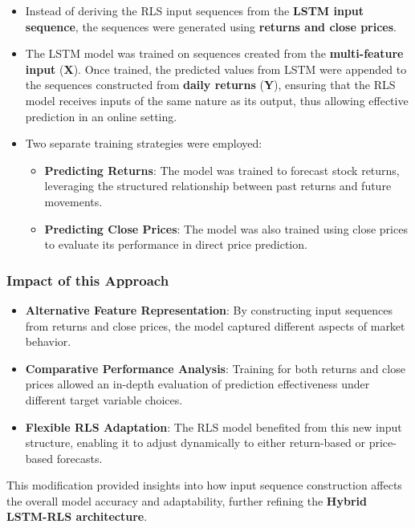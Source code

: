 \begin{itemize}
    \item Instead of deriving the RLS input sequences from the \textbf{LSTM input sequence}, the sequences were generated using \textbf{returns and close prices}.  
    \item The LSTM model was trained on sequences created from the \textbf{multi-feature input} (\textbf{X}). Once trained, the predicted values from LSTM were appended to the sequences constructed from \textbf{daily returns} (\textbf{Y}), ensuring that the RLS model receives inputs of the same nature as its output, thus allowing effective prediction in an online setting.
    \item Two separate training strategies were employed:  
    \begin{itemize}
        \item \textbf{Predicting Returns}: The model was trained to forecast stock returns, leveraging the structured relationship between past returns and future movements.  
        \item \textbf{Predicting Close Prices}: The model was also trained using close prices to evaluate its performance in direct price prediction.
    \end{itemize}
\end{itemize}

\subsubsection{Impact of this Approach}

\begin{itemize}
    \item \textbf{Alternative Feature Representation}: By constructing input sequences \\from returns and close prices, the model captured different aspects of market behavior.  
    \item \textbf{Comparative Performance Analysis}: Training for both returns and close prices allowed an in-depth evaluation of prediction effectiveness under different target variable choices.  
    \item \textbf{Flexible RLS Adaptation}: The RLS model benefited from this new input structure, enabling it to adjust dynamically to either return-based or price-based forecasts.  
\end{itemize}

This modification provided insights into how input sequence construction affects the overall model accuracy and adaptability, further refining the \textbf{Hybrid LSTM-RLS architecture}.

